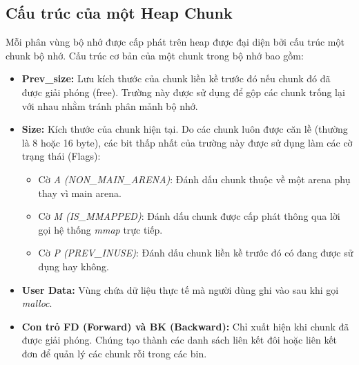 \documentclass[final]{hcmuitthesis}
\begin{document}
\subsection{Cấu trúc của một Heap Chunk}
Mỗi phân vùng bộ nhớ được cấp phát trên heap được đại diện bởi cấu trúc một chunk bộ nhớ. Cấu trúc cơ bản của một chunk trong bộ nhớ bao gồm:
\begin{itemize}
    \item \textbf{Prev\_size:} Lưu kích thước của chunk liền kề trước đó nếu chunk đó đã được giải phóng (free). Trường này được sử dụng để gộp các chunk trống lại với nhau nhằm tránh phân mảnh bộ nhớ.
    \item \textbf{Size:} Kích thước của chunk hiện tại. Do các chunk luôn được căn lề (thường là 8 hoặc 16 byte), các bit thấp nhất của trường này được sử dụng làm các cờ trạng thái (Flags):
    \begin{itemize}
        \item Cờ \textit{A (NON\_MAIN\_ARENA)}: Đánh dấu chunk thuộc về một arena phụ thay vì main arena.
        \item Cờ \textit{M (IS\_MMAPPED)}: Đánh dấu chunk được cấp phát thông qua lời gọi hệ thống \textit{mmap} trực tiếp.
        \item Cờ \textit{P (PREV\_INUSE)}: Đánh dấu chunk liền kề trước đó có đang được sử dụng hay không.
    \end{itemize}
    \item \textbf{User Data:} Vùng chứa dữ liệu thực tế mà người dùng ghi vào sau khi gọi \textit{malloc}.
    \item \textbf{Con trỏ FD (Forward) và BK (Backward):} Chỉ xuất hiện khi chunk đã được giải phóng. Chúng tạo thành các danh sách liên kết đôi hoặc liên kết đơn để quản lý các chunk rỗi trong các bin.
\end{itemize}
\end{document}
